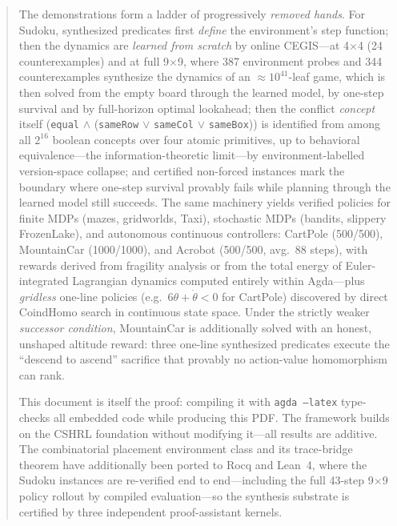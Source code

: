 \documentclass[9pt,a4paper]{article}
\theoremstyle{plain}
\theoremstyle{definition}
\theoremstyle{remark}
\begin{document}
\begin{abstract}
The demonstrations form a ladder of progressively \emph{removed hands}.  For Sudoku, synthesized predicates first \emph{define} the environment's step function; then the dynamics are \emph{learned from scratch} by online CEGIS---at 4$\times$4 (24 counterexamples) and at full 9$\times$9, where 387 environment probes and 344 counterexamples synthesize the dynamics of an $\approx\!10^{41}$-leaf game, which is then solved from the empty board through the learned model, by one-step survival and by full-horizon optimal lookahead; then the conflict \emph{concept} itself (\texttt{equal} $\wedge$ (\texttt{sameRow} $\vee$ \texttt{sameCol} $\vee$ \texttt{sameBox})) is identified from among all $2^{16}$ boolean concepts over four atomic primitives, up to behavioral equivalence---the information-theoretic limit---by environment-labelled version-space collapse; and certified non-forced instances mark the boundary where one-step survival provably fails while planning through the learned model still succeeds.  The same machinery yields verified policies for finite MDPs (mazes, gridworlds, Taxi), stochastic MDPs (bandits, slippery FrozenLake), and autonomous continuous controllers: CartPole (500/500), MountainCar (1000/1000), and Acrobot (500/500, avg.\ 88 steps), with rewards derived from fragility analysis or from the total energy of Euler-integrated Lagrangian dynamics computed entirely within Agda---plus \emph{gridless} one-line policies (e.g.\ $6\theta + \dot\theta < 0$ for CartPole) discovered by direct CoindHomo search in continuous state space.  Under the strictly weaker \emph{successor condition}, MountainCar is additionally solved with an honest, unshaped altitude reward: three one-line synthesized predicates execute the ``descend to ascend'' sacrifice that provably no action-value homomorphism can rank.

This document is itself the proof: compiling it with \texttt{agda --latex} type-checks all embedded code while producing this PDF.
The framework builds on the CSHRL foundation without modifying it---all results are additive.
The combinatorial placement environment class and its trace-bridge theorem have additionally been ported to Rocq and Lean~4, where the Sudoku instances are re-verified end to end---including the full 43-step 9$\times$9 policy rollout by compiled evaluation---so the synthesis substrate is certified by three independent proof-assistant kernels.
\end{abstract}

\end{document}
